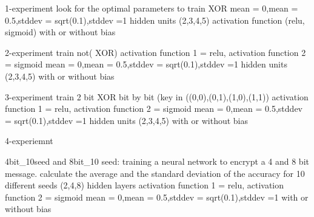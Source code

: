 1-experiment
look for the optimal parameters to train XOR
mean = 0,mean = 0.5,stddev = sqrt(0.1),stddev =1
hidden units (2,3,4,5)
activation function (relu, sigmoid)
with or without bias


2-experiment
train not( XOR)
activation function 1 = relu, activation function 2 = sigmoid 
mean = 0,mean = 0.5,stddev = sqrt(0.1),stddev =1
hidden units (2,3,4,5)
with or without bias

3-experiment
train 2 bit XOR bit by bit (key in ((0,0),(0,1),(1,0),(1,1))
activation function 1 = relu, activation function 2 = sigmoid 
mean = 0,mean = 0.5,stddev = sqrt(0.1),stddev =1
hidden units (2,3,4,5)
with or without bias

4-experiemnt


4bit_10seed and 8bit_10 seed:
training a neural network to encrypt  a 4 and 8 bit message. 
calculate the average and the standard deviation of the accuracy for 10 different seeds 
(2,4,8) hidden layers
activation function 1 = relu, activation function 2 = sigmoid 
mean = 0,mean = 0.5,stddev = sqrt(0.1),stddev =1
with or without bias






